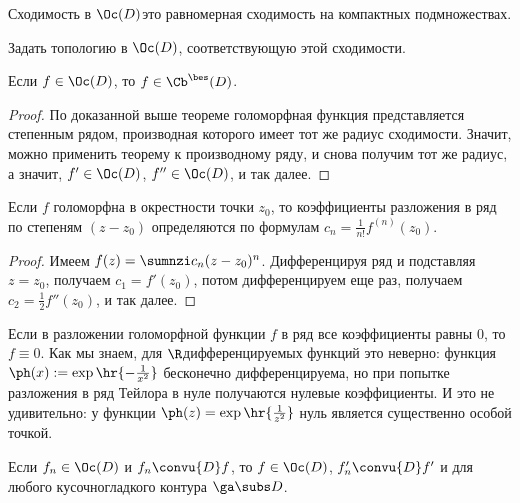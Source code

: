 \documentclass[a4paper]{article}
\begin{document}
\begin{df}
Сходимость в $\Oc(D)$\т это равномерная сходимость на компактных подмножествах.
\end{df}

\begin{problem}
Задать топологию в $\Oc(D)$, соответствующую этой сходимости.
\end{problem}

\begin{stm}
Если $f \in \Oc(D)$, то $f \in \Cb^\bes(D)$.
\end{stm}
\begin{proof}
По доказанной выше теореме голоморфная функция представляется степенным рядом, производная которого
имеет тот же радиус сходимости. Значит, можно применить теорему к производному ряду, и снова получим
тот же радиус, а значит, $f' \in \Oc(D)$, $f'' \in \Oc(D)$, и так далее.
\end{proof}

\begin{stm}
Если $f$ голоморфна в окрестности точки $z_0$, то коэффициенты разложения в ряд по степеням $(z-z_0)$
определяются по формулам $c_n  = \frac{1}{n!} f^{(n)}(z_0)$.
\end{stm}
\begin{proof}
Имеем $f(z) = \sumnzi c_n (z-z_0)^n$. Дифференцируя ряд и подставляя $z=z_0$,
получаем $c_1 = f'(z_0)$, потом дифференцируем еще раз, получаем $c_2 = \frac12 f''(z_0)$, и так далее.
\end{proof}

\begin{note}
Если в разложении голоморфной функции $f$ в ряд все коэффициенты равны $0$, то $f \equiv 0$. Как мы знаем,
для $\R$\д дифференцируемых функций это неверно: функция $\ph(x) := \exp\hr{-\frac{1}{x^2}}$ бесконечно дифференцируема,
но при попытке разложения в ряд Тейлора в нуле получаются нулевые коэффициенты. И это не удивительно: у функции
$\ph(z) = \exp \hr{\frac1{z^2}}$ нуль является существенно особой точкой.
\end{note}

\begin{theorem}[Вейерштрасса]
Если $f_n \in \Oc(D)$ и $f_n \convu{D} f$, то
$f \in \Oc(D)$, $f_n' \convu{D} f'$ и
для любого кусочно\д гладкого контура $\ga \subs D$.
\end{theorem}
\end{document}
